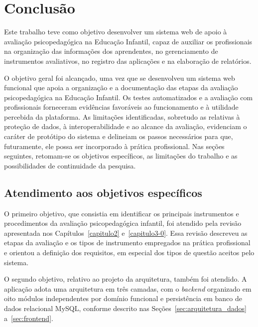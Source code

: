 \chapter[Conclusão]{Conclusão} \label{capitulo7}

Este trabalho teve como objetivo desenvolver um sistema web de apoio à avaliação psicopedagógica na Educação Infantil, capaz de auxiliar os profissionais na organização das informações dos aprendentes, no gerenciamento de instrumentos avaliativos, no registro das aplicações e na elaboração de relatórios.

O objetivo geral foi alcançado, uma vez que se desenvolveu um sistema web funcional que apoia a organização e a documentação das etapas da avaliação psicopedagógica na Educação Infantil. Os testes automatizados e a avaliação com profissionais forneceram evidências favoráveis ao funcionamento e à utilidade percebida da plataforma. As limitações identificadas, sobretudo as relativas à proteção de dados, à interoperabilidade e ao alcance da avaliação, evidenciam o caráter de protótipo do sistema e delineiam os passos necessários para que, futuramente, ele possa ser incorporado à prática profissional. Nas seções seguintes, retomam-se os objetivos específicos, as limitações do trabalho e as possibilidades de continuidade da pesquisa.

\section{Atendimento aos objetivos específicos}

O primeiro objetivo, que consistia em identificar os principais instrumentos e procedimentos da avaliação psicopedagógica infantil, foi atendido pela revisão apresentada nos Capítulos~\ref{capitulo2} e~\ref{capitulo3-0}. Essa revisão descreveu as etapas da avaliação e os tipos de instrumento empregados na prática profissional e orientou a definição dos requisitos, em especial dos tipos de questão aceitos pelo sistema.

O segundo objetivo, relativo ao projeto da arquitetura, também foi atendido. A aplicação adota uma arquitetura em três camadas, com o \textit{backend} organizado em oito módulos independentes por domínio funcional e persistência em banco de dados relacional MySQL, conforme descrito nas Seções~\ref{sec:arquitetura_dados} a~\ref{sec:frontend}.

